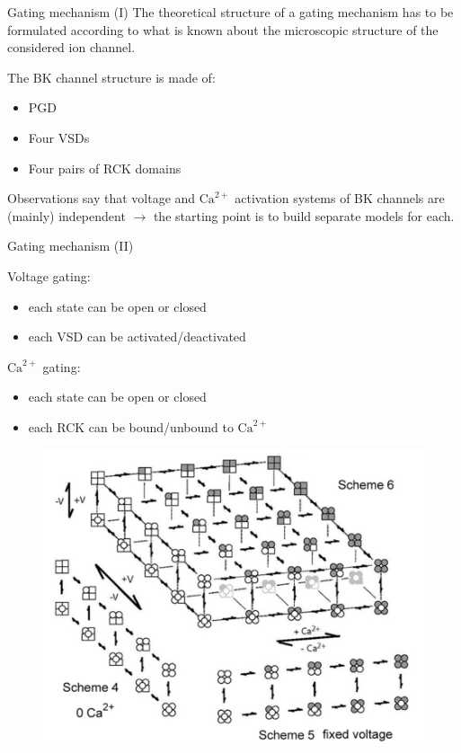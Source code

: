 \documentclass{beamer}
\newcommand{\ca}{\text{Ca}^{2+}}
\begin{document}
\begin{frame}{Gating mechanism (I)}
The theoretical structure of a gating mechanism has to be formulated according to what is known about the microscopic structure of the considered ion channel.

The BK channel structure is made of:
\begin{itemize}
	\item PGD
	\item Four VSDs
	\item Four pairs of RCK domains
\end{itemize}
 
Observations say that voltage and $\ca$ activation systems of BK channels are (mainly) independent $\rightarrow$ the starting point is to build separate models for each.
\end{frame}

\begin{frame}{Gating mechanism (II)}
\begin{minipage}{.46\textwidth}
Voltage gating:
\begin{itemize}
	\item each state can be open or closed
	\item each VSD can be activated/deactivated
\end{itemize}
\bigskip
$\ca$ gating:
\begin{itemize}
	\item each state can be open or closed
	\item each RCK can be bound/unbound to $\ca$
\end{itemize}
\end{minipage}
\begin{minipage}{.52\textwidth}
\begin{figure}
\centering
\includegraphics[width=\textwidth]{50_State_Model.png}
\end{figure}
\end{minipage}
\end{frame}
\end{document}

